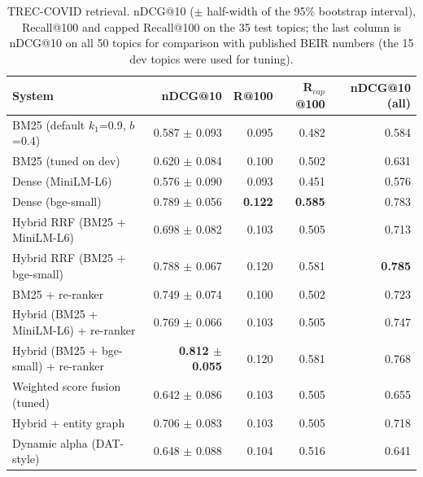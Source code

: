 \begin{table}[t]
\centering\small
\begin{tabular}{lrrrr}
\toprule
System & nDCG@10 & R@100 & R$_{cap}$@100 & nDCG@10 (all) \\
\midrule
BM25 (default $k_1$=0.9, $b$=0.4) & 0.587 $\pm$ 0.093 & 0.095 & 0.482 & 0.584 \\
BM25 (tuned on dev) & 0.620 $\pm$ 0.084 & 0.100 & 0.502 & 0.631 \\
Dense (MiniLM-L6) & 0.576 $\pm$ 0.090 & 0.093 & 0.451 & 0.576 \\
Dense (bge-small) & 0.789 $\pm$ 0.056 & \textbf{0.122} & \textbf{0.585} & 0.783 \\
\midrule
Hybrid RRF (BM25 + MiniLM-L6) & 0.698 $\pm$ 0.082 & 0.103 & 0.505 & 0.713 \\
Hybrid RRF (BM25 + bge-small) & 0.788 $\pm$ 0.067 & 0.120 & 0.581 & \textbf{0.785} \\
\midrule
BM25 + re-ranker & 0.749 $\pm$ 0.074 & 0.100 & 0.502 & 0.723 \\
Hybrid (BM25 + MiniLM-L6) + re-ranker & 0.769 $\pm$ 0.066 & 0.103 & 0.505 & 0.747 \\
Hybrid (BM25 + bge-small) + re-ranker & \textbf{0.812 $\pm$ 0.055} & 0.120 & 0.581 & 0.768 \\
\midrule
Weighted score fusion (tuned) & 0.642 $\pm$ 0.086 & 0.103 & 0.505 & 0.655 \\
\midrule
Hybrid + entity graph & 0.706 $\pm$ 0.083 & 0.103 & 0.505 & 0.718 \\
\midrule
Dynamic alpha (DAT-style) & 0.648 $\pm$ 0.088 & 0.104 & 0.516 & 0.641 \\
\bottomrule
\end{tabular}
\caption{TREC-COVID retrieval. nDCG@10 ($\pm$ half-width of the 95\% bootstrap interval), Recall@100 and capped Recall@100 on the 35 test topics; the last column is nDCG@10 on all 50 topics for comparison with published BEIR numbers (the 15 dev topics were used for tuning).}
\label{tab:retrieval_trec}
\end{table}
